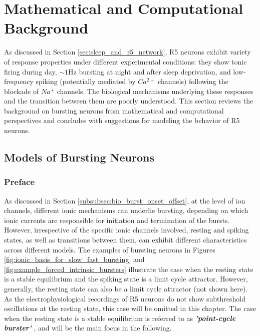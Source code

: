 \documentclass[../main.tex]{subfiles}
\begin{document}

\section{Mathematical and Computational Background}

As discussed in Section \ref{sec:sleep_and_r5_network}, R5 neurons exhibit variety of response properties under different experimental conditions: they show tonic firing during day, $\sim1$Hz bursting at night and after sleep deprivation, and low-frequency spiking (potentially mediated by $Ca^{2+}$ channels) following the blockade of $Na^+$ channels. The biological mechanisms underlying these responses and the transition between them are poorly understood. This section reviews the background on bursting neurons from mathematical and computational perspectives and concludes with suggestions for modeling the behavior of R5 neurons.

\subsection{Models of Bursting Neurons}

\subsubsection{Preface} \label{subsubsec:bursting_models_preface}

As discussed in Section \ref{subsubsec:bio_burst_onset_offset}, at the level of ion channels, different ionic mechanisms can underlie bursting, depending on which ionic currents are responsible for initiation and termination of the bursts.
However, irrespective of the specific ionic channels involved, resting and spiking states, as well as transitions between them, can exhibit different characteristics across different models. The examples of bursting neurons in Figures \ref{fig:ionic_basis_for_slow_fast_bursting}
and \ref{fig:example_forced_intrinsic_bursters} illustrate the case when the resting
state is a stable equilibrium and the spiking state is a limit cycle attractor. However,
generally, the resting state can also be a limit cycle attractor (not shown here).
As the electrophysiological recordings of R5 neurons do not show subthreshold oscillations
at the resting state, this case will be omitted in this chapter. The case when the resting state
is a stable equilibrium is referred to as \textbf{\textit{'point-cycle burster'}}
\parencite{izhikevichNEURALEXCITABILITYSPIKING2000}, and will be the main focus in the following.
\end{document}
